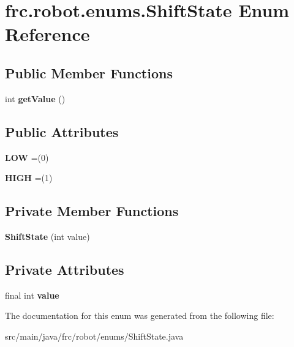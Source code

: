 \hypertarget{enumfrc_1_1robot_1_1enums_1_1_shift_state}{}\section{frc.\+robot.\+enums.\+Shift\+State Enum Reference}
\label{enumfrc_1_1robot_1_1enums_1_1_shift_state}
\subsection*{Public Member Functions}
\begin{DoxyCompactItemize}
\item 
\mbox{\label{enumfrc_1_1robot_1_1enums_1_1_shift_state_a81a4fa35c5b874491284b50659a3bd3b}} 
int {\bfseries get\+Value} ()
\end{DoxyCompactItemize}
\subsection*{Public Attributes}
\begin{DoxyCompactItemize}
\item 
\mbox{\label{enumfrc_1_1robot_1_1enums_1_1_shift_state_aae2d443b7ecb1b3d46bbc1fbc403c3ad}} 
{\bfseries L\+OW} =(0)
\item 
\mbox{\label{enumfrc_1_1robot_1_1enums_1_1_shift_state_a5d296c6e6499f07a334de1390542b086}} 
{\bfseries H\+I\+GH} =(1)
\end{DoxyCompactItemize}
\subsection*{Private Member Functions}
\begin{DoxyCompactItemize}
\item 
\mbox{\label{enumfrc_1_1robot_1_1enums_1_1_shift_state_a8d58417e7a85f52fac278c975cba0ec0}} 
{\bfseries Shift\+State} (int value)
\end{DoxyCompactItemize}
\subsection*{Private Attributes}
\begin{DoxyCompactItemize}
\item 
\mbox{\label{enumfrc_1_1robot_1_1enums_1_1_shift_state_a2a32113ef4a7f71cd1ea977cc16c31a4}} 
final int {\bfseries value}
\end{DoxyCompactItemize}


The documentation for this enum was generated from the following file\+:\begin{DoxyCompactItemize}
\item 
src/main/java/frc/robot/enums/Shift\+State.\+java\end{DoxyCompactItemize}
